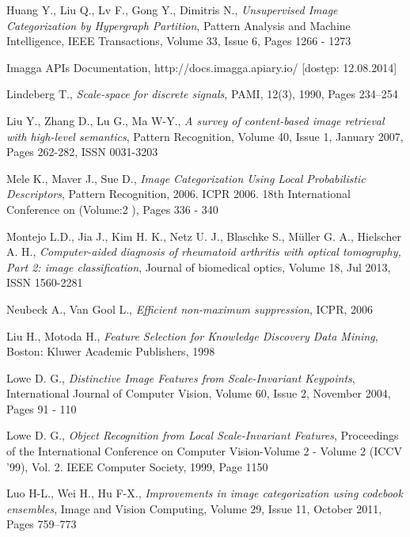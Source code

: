 \begin{thebibliography}{100}

 Huang Y., Liu Q., Lv F., Gong Y., Dimitris N., \emph{Unsupervised Image Categorization by Hypergraph Partition}, Pattern Analysis and Machine Intelligence, IEEE Transactions, Volume 33, Issue 6, Pages 1266 - 1273

 Imagga APIs Documentation, http://docs.imagga.apiary.io/ [dostęp: 12.08.2014]

 Lindeberg T., \emph{Scale-space for discrete signals}, PAMI, 12(3), 1990, Pages 234–254

 Liu Y., Zhang D., Lu G., Ma W-Y., \emph{A survey of content-based image retrieval with high-level semantics}, Pattern Recognition, Volume 40, Issue 1, January 2007, Pages 262-282, ISSN 0031-3203

 Mele K., Maver J., Sue D., \emph{Image Categorization Using Local Probabilistic Descriptors}, Pattern Recognition, 2006. ICPR 2006. 18th International Conference on  (Volume:2 ), Pages 336 - 340

 Montejo L.D., Jia J., Kim H. K., Netz U. J., Blaschke S., Müller G. A., Hielscher A. H., \emph{Computer-aided diagnosis of rheumatoid arthritis with optical tomography, Part 2: image classification}, Journal of biomedical optics, Volume 18, Jul 2013, ISSN 1560-2281

 Neubeck A., Van Gool L., \emph{Efficient non-maximum suppression}, ICPR, 2006

 Liu H., Motoda H., \emph{Feature Selection for Knowledge Discovery Data Mining}, Boston: Kluwer Academic Publishers, 1998

 Lowe D. G., \emph{Distinctive Image Features from Scale-Invariant Keypoints}, International Journal of Computer Vision, Volume 60, Issue 2, November 2004, Pages 91 - 110 

 Lowe D. G., \emph{Object Recognition from Local Scale-Invariant Features}, Proceedings of the International Conference on Computer Vision-Volume 2 - Volume 2 (ICCV '99), Vol. 2. IEEE Computer Society, 1999, Page 1150

 Luo H-L., Wei H., Hu F-X., \emph{Improvements in image categorization using codebook ensembles}, Image and Vision Computing, Volume 29, Issue 11, October 2011, Pages 759–773


\end{thebibliography}
